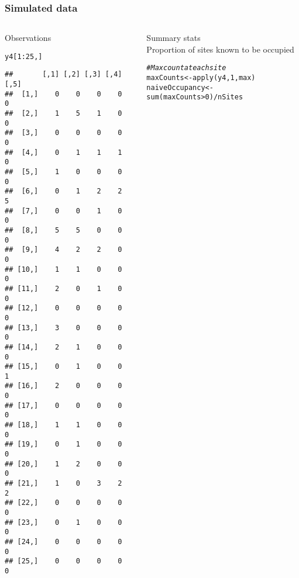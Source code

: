 \documentclass[color=usenames,dvipsnames]{beamer}\usepackage[]{graphicx}\usepackage[]{xcolor}
\makeatletter
\newcommand{\hlnum}[1]{\textcolor[rgb]{0.69,0.494,0}{#1}}%
\newcommand{\hlcom}[1]{\textcolor[rgb]{0.514,0.506,0.514}{\textit{#1}}}%
\newcommand{\hlopt}[1]{\textcolor[rgb]{0,0,0}{#1}}%
\newcommand{\hldef}[1]{\textcolor[rgb]{0,0,0}{#1}}%
\newcommand{\hlkwb}[1]{\textcolor[rgb]{0,0.341,0.682}{#1}}%
\newcommand{\hlkwd}[1]{\textcolor[rgb]{0.004,0.004,0.506}{#1}}%
\newenvironment{kframe}{%
 \def\at@end@of@kframe{}%
 \ifinner\ifhmode%
  \def\at@end@of@kframe{\end{minipage}}%
  \begin{minipage}{\columnwidth}%
 \fi\fi%
 \def\FrameCommand##1{\hskip\@totalleftmargin \hskip-\fboxsep
 \colorbox{shadecolor}{##1}\hskip-\fboxsep
     \hskip-\linewidth \hskip-\@totalleftmargin \hskip\columnwidth}%
 \MakeFramed {\advance\hsize-\width
   \@totalleftmargin\z@ \linewidth\hsize
   \@setminipage}}%
 {\par\unskip\endMakeFramed%
 \at@end@of@kframe}
\newenvironment{knitrout}{}{} %
\makeatother
\begin{document}
\begin{frame}[fragile]
  \frametitle{Simulated data}
  \begin{columns}
    \begin{column}{0.4\textwidth}
      \small
      Observations
  \vspace{-6pt}
\begin{knitrout}\tiny
{}\color{fgcolor}\begin{kframe}
\begin{alltt}
\hldef{y4[}\hlnum{1}\hlopt{:}\hlnum{25}\hldef{,]}
\end{alltt}
\begin{verbatim}
##       [,1] [,2] [,3] [,4] [,5]
##  [1,]    0    0    0    0    0
##  [2,]    1    5    1    0    0
##  [3,]    0    0    0    0    0
##  [4,]    0    1    1    1    0
##  [5,]    1    0    0    0    0
##  [6,]    0    1    2    2    5
##  [7,]    0    0    1    0    0
##  [8,]    5    5    0    0    0
##  [9,]    4    2    2    0    0
## [10,]    1    1    0    0    0
## [11,]    2    0    1    0    0
## [12,]    0    0    0    0    0
## [13,]    3    0    0    0    0
## [14,]    2    1    0    0    0
## [15,]    0    1    0    0    1
## [16,]    2    0    0    0    0
## [17,]    0    0    0    0    0
## [18,]    1    1    0    0    0
## [19,]    0    1    0    0    0
## [20,]    1    2    0    0    0
## [21,]    1    0    3    2    2
## [22,]    0    0    0    0    0
## [23,]    0    1    0    0    0
## [24,]    0    0    0    0    0
## [25,]    0    0    0    0    0
\end{verbatim}
\end{kframe}
\end{knitrout}
  \end{column}
  \begin{column}{0.6\textwidth}
    \pause
    {\centering Summary stats \\}
    \vspace{24pt}
    \small
    Proportion of sites known to be occupied
    \vspace{-6pt}
\begin{knitrout}\scriptsize
{}\color{fgcolor}\begin{kframe}
\begin{alltt}
\hlcom{# Max count at each site}
\hldef{maxCounts} \hlkwb{<-} \hlkwd{apply}\hldef{(y4,} \hlnum{1}\hldef{, max)}
\hldef{naiveOccupancy} \hlkwb{<-} \hlkwd{sum}\hldef{(maxCounts}\hlopt{>}\hlnum{0}\hldef{)}\hlopt{/}\hldef{nSites}

\end{alltt}
\end{kframe}
\end{knitrout}
\end{column}
\end{columns}
\end{frame}
\end{document}
